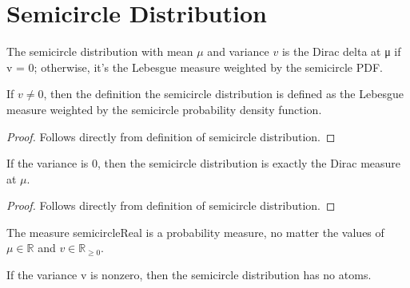 \section{Semicircle Distribution}




\begin{definition}
    \label{def:semicircle_distribution}
    \leanok
    The semicircle distribution with mean $\mu$ and variance $v$ is the Dirac delta at μ if v = 0; otherwise, it's the Lebesgue measure weighted by the semicircle PDF.
\end{definition}

\begin{lemma}
    \label{lemma:semicircleReal_of_var_ne_zero}
    \leanok
    If $v \neq 0$, then the definition the semicircle distribution is defined as the Lebesgue measure weighted by the semicircle probability density function.
\end{lemma}

\begin{proof}
    Follows directly from definition of semicircle distribution.
\end{proof}

\begin{lemma}
    \label{lemma:semicircleReal_zero_var}
    \leanok
    If the variance is 0, then the semicircle distribution is exactly the Dirac measure at $\mu$.
\end{lemma}

\begin{proof}
    Follows directly from definition of semicircle distribution.
\end{proof}

\begin{lemma} %
    \label{lemma:instIsProbabilityMeasuresemicircleReal}
    \leanok
    The measure semicircleReal is a probability measure, no matter the values of $\mu \in \mathbb{R}$ and $v \in \mathbb{R}_{\ge 0}$.
\end{lemma}


\begin{lemma}
    \label{lemma:noAtoms_semicircleReal}
    \leanok
    If the variance v is nonzero, then the semicircle distribution has no atoms.
\end{lemma}

